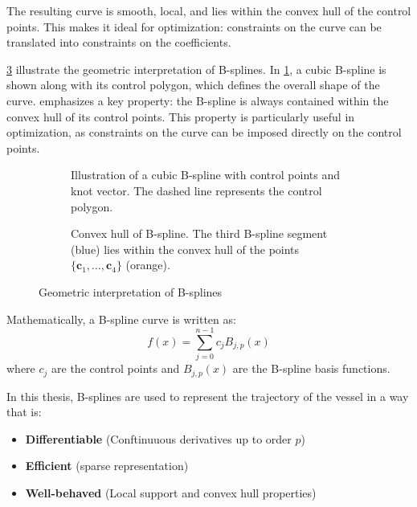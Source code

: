 The resulting curve is smooth, local, and lies within the convex hull of the control points. This makes it ideal for optimization: constraints on the curve can be translated into constraints on the coefficients.


\cref{fig:b-spline-geometric} illustrate the geometric interpretation of B-splines. In \cref{fig:b-spline-knots-control-points}, a cubic B-spline is shown along with its control polygon, which defines the overall shape of the curve.  emphasizes a key property: the B-spline is always contained within the convex hull of its control points. This property is particularly useful in optimization, as constraints on the curve can be imposed directly on the control points.

\begin{figure}
    \centering
    \begin{subfigure}[b]{0.45\textwidth}
        \centering
        
        \caption{Illustration of a cubic B-spline with control points and knot vector. The dashed line represents the control polygon.}
        \label{fig:b-spline-knots-control-points}
    \end{subfigure}
    \hfill
    \begin{subfigure}[b]{0.45\textwidth}
        \centering
        
        \caption{Convex hull of B-spline. The third B-spline segment (blue) lies within the convex hull of the points $\{\mathbf c_1,\ldots,\mathbf c_4\}$ (orange).}
        \label{fig:b-spline-convex-hull} 
    \end{subfigure}
    \caption{Geometric interpretation of B-splines}
    \label{fig:b-spline-geometric}
\end{figure}

Mathematically, a B-spline curve is written as:
\[
f(x) = \sum_{j=0}^{n-1} c_j B_{j,p}(x)
\]
where \( c_j \) are the control points and \( B_{j,p}(x) \) are the B-spline basis functions.

In this thesis, B-splines are used to represent the trajectory of the vessel in a way that is:
\begin{itemize}
    \item \textbf{Differentiable} (Conftinuuous derivatives up to order \( p \))
    \item \textbf{Efficient} (sparse representation)
    \item \textbf{Well-behaved} (Local support and convex hull properties)
\end{itemize}

